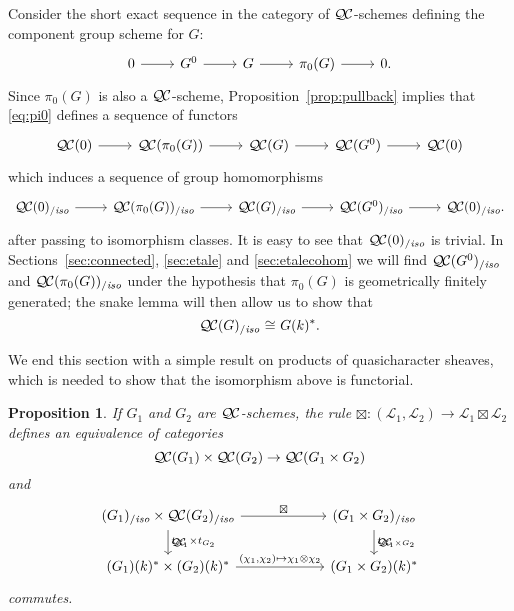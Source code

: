 \documentclass[11pt]{amsart}
\theoremstyle{plain}
\newtheorem{proposition}[theorem]{Proposition}
\theoremstyle{definition}
\theoremstyle{remark}
\newcommand{\Fq}{k}
\newcommand{\iso}{{\ \cong\ }}
\newcommand{\qcs}[1]{{\mathcal{#1}}}
\newcommand{\QC}{{\mathcal{Q\hskip-0.8pt C}}}
\newcommand{\QCiso}[1]{\QC(#1)_{/\textit{iso}}}
\newcommand{\trFrob}[1]{t_{#1}}
\begin{document}
Consider the short exact sequence in the category of $\QC$-schemes
defining the component group scheme for $G$:
\begin{equation}\label{eq:pi0}
\begin{tikzcd}
0 \rar & G^0 \rar & G \rar & \pi_0(G) \rar & 0.
\end{tikzcd}
\end{equation}
Since $\pi_0(G)$ is also a $\QC$-scheme, 
Proposition~\ref{prop:pullback} implies that \eqref{eq:pi0} defines a sequence of functors
\[
\begin{tikzcd}
\QC(0) \rar & \QC(\pi_0(G)) \rar & \QC(G) \rar & \QC(G^0) \rar & \QC(0)
\end{tikzcd}
\]
which induces a sequence of group homomorphisms 
\[
\begin{tikzcd}
\QCiso{0} \rar & \QCiso{\pi_0(G)} \rar & \QCiso{G} \rar & \QCiso{G^0} \rar & \QCiso{0}.
\end{tikzcd}
\]
after passing to isomorphism classes.  It is easy to see that $\QCiso{0}$ is trivial. In Sections~\ref{sec:connected}, \ref{sec:etale} and \ref{sec:etalecohom} we will find $\QCiso{G^0}$
and $\QCiso{\pi_0(G)}$ under the hypothesis that $\pi_0(G)$ is geometrically finitely generated; 
the snake lemma will then allow us to show that
\[
\QCiso{G} \iso G(\Fq)^*.
\]


We end this section with a simple result on products of quasicharacter sheaves,
which is needed to show that the isomorphism above is functorial.

\begin{proposition}\label{prop:product}
If $G_1$ and $G_2$ are $\QC$-schemes, the rule $\boxtimes : (\qcs{L}_1,\qcs{L}_2)\to \qcs{L}_1\boxtimes\qcs{L}_2$ defines an equivalence of categories 
\[
\QC(G_1)\times \QC(G_2) \to \QC(G_1\times G_2)
\]
and 
\[
\begin{tikzcd}[column sep=60]
\arrow{d}{\trFrob{G_1} \times \trFrob{G_2}} \QCiso{G_1}\times \QCiso{G_2} \arrow{r}{\boxtimes}
& \arrow{d}{\trFrob{G_1\times G_2}} \QCiso{G_1\times G_2}\\
(G_1)(\Fq)^*\times (G_2)(\Fq)^* \arrow{r}{(\chi_1,\chi_2)\mapsto \chi_1\otimes \chi_2}  & (G_1\times G_2)(\Fq)^*
\end{tikzcd}
\]
commutes.
\end{proposition}
\end{document}
